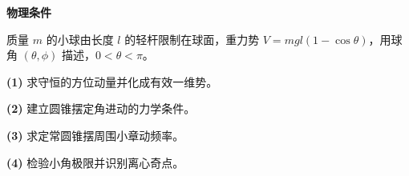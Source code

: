 \textbf{物理条件}\par 质量 \(m\) 的小球由长度 \(l\) 的轻杆限制在球面，重力势 \(V=mgl(1-\cos\theta)\)，用球角 \((\theta,\phi)\) 描述，\(0<\theta<\pi\)。
\par\noindent\textbf{(1)} 求守恒的方位动量并化成有效一维势。
\par\noindent\textbf{(2)} 建立圆锥摆定角进动的力学条件。
\par\noindent\textbf{(3)} 求定常圆锥摆周围小章动频率。
\par\noindent\textbf{(4)} 检验小角极限并识别离心奇点。
